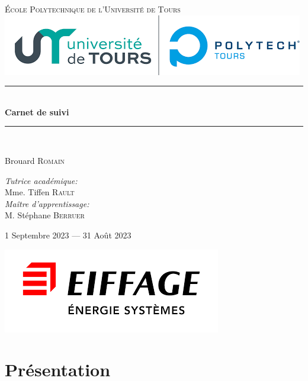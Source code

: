 \documentclass[12pt, openany]{report}
\newcommand{\HRule}{\rule{\linewidth}{0.5mm}}
\begin{document}
    \begin{titlepage}
        \begin{center}
            \textsc{\LARGE École Polytechnique de l'Université de Tours}
            \\[2cm]

            \includegraphics{img/polytech}
            \\[2cm]

            \HRule \\[0.4cm]
            { \huge \bfseries Carnet de suivi\\[0.4cm] }

            \HRule \\[2cm]

            \begin{minipage}{0.4\textwidth}
                \begin{flushleft} \large
                Brouard \textsc{Romain}\\
                \end{flushleft}
            \end{minipage}
            \begin{minipage}{0.4\textwidth}
                \begin{flushright} \large
                \emph{Tutrice académique:}\\ Mme. Tiffen \textsc{Rault}\\
                \emph{Maître d'apprentissage:}\\ M. Stéphane \textsc{Berruer}
                \end{flushright}
            \end{minipage}

            \vfill

            {\large 1\ier{} Septembre 2023 — 31 Août 2023}

            \includegraphics{img/eiffage}

        \end{center}
    \end{titlepage}

    \setcounter{tocdepth}{1}
    \tableofcontents

    \chapter{Présentation}
\end{document}
